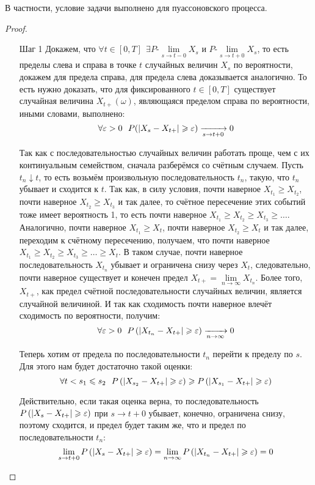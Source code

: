 \begin{note}
    В частности, условие задачи выполнено для пуассоновского процесса.
\end{note}

\begin{proof}~
    \begin{itemize}
        \item[Шаг 1] Докажем, что $\forall t \in [0, T] \ \ \exists P\text{-}\lim\limits_{s \to t-0} X_s \text{ и } P\text{-}\lim\limits_{s \to t+0} X_s$, то есть пределы слева и справа в точке $t$ случайных величин $X_s$ по вероятности, докажем для предела справа, для предела слева доказывается аналогично. То есть нужно доказать, что для фиксированного $t \in [0, T]$ существует случайная величина $X_{t+}(\omega)$, являющаяся пределом справа по вероятности, иными словами, выполнено:
        \[
            \forall \varepsilon > 0 \ \ P(|X_s - X_{t+}| \geqslant \varepsilon) \xrightarrow[s \to t+0]{} 0
        \]

        Так как с последовательностью случайных величин работать проще, чем с их континуальным семейством, сначала разберёмся со счётным случаем. Пусть $t_n \downarrow t$, то есть возьмём произвольную последовательность $t_n$, такую, что $t_n$ убывает и сходится к $t$. Так как, в силу условия, почти наверное $X_{t_1} \ge X_{t_2}$, почти наверное $X_{t_2} \ge X_{t_3}$ и так далее, то счётное пересечение этих событий тоже имеет вероятность 1, то есть почти наверное $X_{t_1} \ge X_{t_2} \ge X_{t_3} \ge \dots$. Аналогично, почти наверное $X_{t_1} \ge X_t$, почти наверное $X_{t_2} \ge X_t$ и так далее, переходим к счётному пересечению, получаем, что почти наверное $X_{t_1} \ge X_{t_2} \ge X_{t_3} \ge \dots \ge X_t$. В таком случае, почти наверное последовательность $X_{t_n}$ убывает и ограничена снизу через $X_t$, следовательно, почти наверное существует и конечен предел $X_{t+} = \lim\limits_{n \to \infty} X_{t_n}$. Более того, $X_{t+}$, как предел счётной последовательности случайных величин, является случайной величиной. И так как сходимость почти наверное влечёт сходимость по вероятности, получим:
        \[
            \forall \varepsilon > 0 \ \ P\left(|X_{t_n} - X_{t+}| \geqslant \varepsilon\right) \xrightarrow[n \to \infty]{} 0
        \]
        
        Теперь хотим от предела по последовательности $t_n$ перейти к пределу по $s$. Для этого нам будет достаточно такой оценки:
        \[
            \forall t < s_1 \leqslant s_2 \ \ P\left(|X_{s_2} - X_{t+}| \geqslant \varepsilon\right) \geqslant P\left(|X_{s_1} - X_{t+}| \geqslant \varepsilon\right)
        \]

        Действительно, если такая оценка верна, то последовательность $P\left(|X_s - X_{t+}| \geqslant \varepsilon\right)$ при $s \to t+0$ убывает, конечно, ограничена снизу, поэтому сходится, и предел будет таким же, что и предел по последовательности $t_n$:
        \[
            \lim_{s \to t+0} P\left(|X_s - X_{t+}| \geqslant \varepsilon\right) = \lim_{n \to \infty} P\left(|X_{t_n} - X_{t+}| \geqslant \varepsilon\right) = 0
        \]


\end{itemize}
\end{proof}
